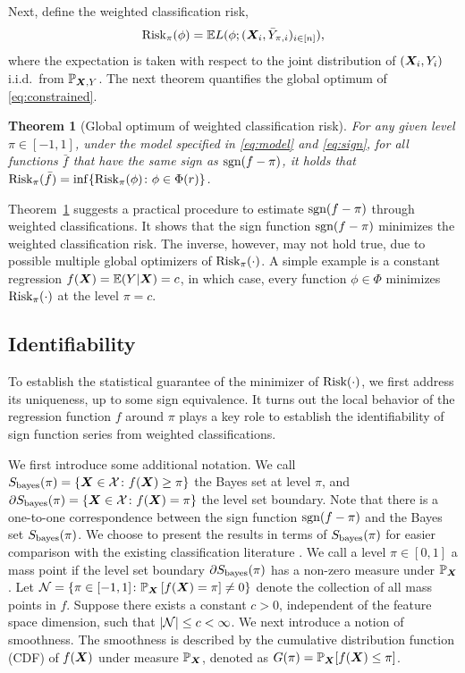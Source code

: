 \documentclass[aos]{imsart}
\newtheorem{theorem}{Theorem}%
\theoremstyle{definition}
\def\sign{\textup{sgn}}
\def\risk{\textup{Risk}}
\def\bayesS{S_{\textup{bayes}}}
\begin{document}
Next, define the weighted classification risk, 
\begin{equation}\label{eq:constrained}
\risk_\pi(\phi)=\mathbb{E}L(\phi; (\mX_i,\bar Y_{\pi,i})_{i\in[n]}),
\end{equation}
where the expectation is taken with respect to the joint distribution of $(\bm X_i,Y_i)$ i.i.d.\ from $\mathbb{P}_{\bm X,Y}$. The next theorem quantifies the global optimum of \eqref{eq:constrained}. 

\begin{theorem}[Global optimum of weighted classification risk]\label{thm:oracle} For any given level $\pi\in[-1,1]$, under the model specified in \eqref{eq:model} and \eqref{eq:sign}, for all functions $\bar f$ that have the same sign as $\sign(f-\pi)$, it holds that $\risk_\pi(\bar f) = \inf\{\risk_\pi(\phi)\colon \phi\in \Phi(r)\}$. 
\end{theorem}

\noindent
Theorem~\ref{thm:oracle} suggests a practical procedure to estimate $\sign(f-\pi)$ through weighted classifications. It shows that the sign function $\sign(f-\pi)$ minimizes the weighted classification risk. The inverse, however, may not hold true, due to possible multiple global optimizers of $\risk_\pi(\cdot)$. A simple example is a constant regression $f(\bm X)=\mathbb{E}(Y|\bm X) = c$, in which case, every function $\phi\in \Phi$ minimizes $\risk_\pi(\cdot)$ at the level $\pi=c$. 



\subsection{Identifiability}

To establish the statistical guarantee of the minimizer of $\risk(\cdot)$, we first address its uniqueness, up to some sign equivalence. It turns out the local behavior of the regression function $f$ around $\pi$ plays a key role to establish the identifiability of sign function series from weighted classifications.

We first introduce some additional notation. We call $\bayesS(\pi)=\{\mX\in\tX\colon f(\mX)\geq \pi\}$ the Bayes set at level $\pi$, and $\partial \bayesS(\pi)=\{\mX\in \tX\colon f(\mX)=\pi\}$ the level set boundary. Note that there is a one-to-one correspondence between the sign function $\sign(f-\pi)$ and the Bayes set $\bayesS(\pi)$. We choose to present the results in terms of $\bayesS(\pi)$ for easier comparison with the existing classification literature \citep{tsybakov2004optimal,singh2009adaptive}. We call a level $\pi\in[0,1]$ a mass point if the level set boundary $\partial \bayesS(\pi)$ has a non-zero measure under $\mathbb{P}_{\bm X}$. Let $\mathcal{N}=\{\pi\in[-1,1] \colon \mathbb{P}_{\bm X}\left[f(\bm X)=\pi\right]\neq 0\}$ denote the collection of all mass points in $f$. Suppose there exists a constant $c>0$, independent of the feature space dimension, such that $|\mathcal{N}|\leq c<\infty$. 
We next introduce a notion of smoothness. The smoothness is described by the cumulative distribution function (CDF) of $f(\bm X)$ under measure $ \mathbb{P}_{\bm X}$, denoted as $G(\pi)=\mathbb{P}_{\bm X}[f(\bm X)\leq \pi]$.
\end{document}
